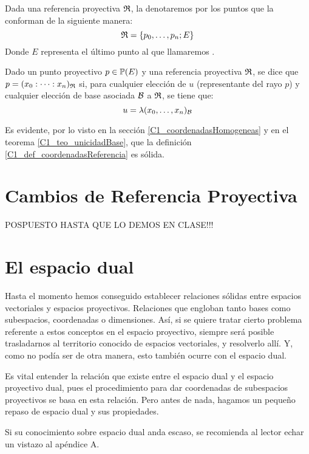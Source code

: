 Dada una referencia proyectiva $\mathfrak{R}$, la denotaremos por los puntos que la conforman de la siguiente manera:
\begin{equation}
\label{C1_eq_notacionReferencias}
\mathfrak{R}=\{p_0,\dots,p_n;E\}
\end{equation}
Donde $E$ representa el último punto al que llamaremos .
\begin{defi}
	\label{C1_def_coordenadasReferencia}
	Dado un punto proyectivo $p\in\mathbb{P}(E)$ y una referencia proyectiva $\mathfrak{R}$, se dice que $p=(x_0:\dots :x_n)_{\mathfrak{R}}$ si, para cualquier elección de $u$ (representante del rayo $p$) y cualquier elección de base asociada $\mathcal{B}$ a $\mathfrak{R}$, se tiene que:
	\[u=\lambda(x_0,\dots,x_n)_{\mathcal{B}}\]
\end{defi}
Es evidente, por lo visto en la sección \ref{C1_coordenadasHomogeneas} y en el teorema \ref{C1_teo_unicidadBase}, que la definición \ref{C1_def_coordenadasReferencia} es sólida.
\section{Cambios de Referencia Proyectiva}
POSPUESTO HASTA QUE LO DEMOS EN CLASE!!!
\section{El espacio dual}
Hasta el momento hemos conseguido establecer relaciones sólidas entre espacios vectoriales y espacios proyectivos. Relaciones que engloban tanto bases como subespacios, coordenadas o dimensiones. Así, si se quiere tratar cierto problema referente a estos conceptos en el espacio proyectivo, siempre será posible trasladarnos al territorio conocido de espacios vectoriales, y resolverlo allí. Y, como no podía ser de otra manera, esto también ocurre con el espacio dual. 

Es vital entender la relación que existe entre el espacio dual y el espacio proyectivo dual, pues el procedimiento para dar coordenadas de subespacios proyectivos se basa en esta relación. Pero antes de nada, hagamos un pequeño repaso de espacio dual y sus propiedades.

Si su conocimiento sobre espacio dual anda escaso, se recomienda al lector echar un vistazo al apéndice A. 

